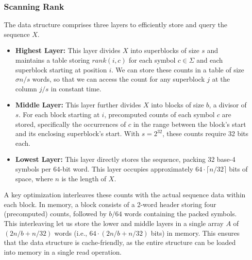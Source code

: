 
\subsubsection{Scanning Rank}

The data structure comprises three layers to efficiently store and query the sequence \(X\).


\begin{itemize}
    \item \textbf{Highest Layer:} This layer divides \(X\) into superblocks of size \(s\) and maintains a table storing $rank(i,c)$ for each symbol $c \in \Sigma$ and each superblock starting at position \(i\). We can store these counts in a table of size $\sigma n / s$ words, so that we can access the count for any superblock $j$ at the column $j/s$ in constant time.
    \item \textbf{Middle Layer:} This layer further divides \(X\) into blocks of size \(b\), a divisor of \(s\). For each block starting at \(i\), precomputed counts of each symbol \(c\) are stored, specifically the occurrences of \(c\) in the range between the block's start and its enclosing superblock's start. With \(s=2^{32}\), these counts require 32 bits each.
    \item \textbf{Lowest Layer:} This layer directly stores the sequence, packing 32 base-4 symbols per 64-bit word. This layer occupies approximately $64 \cdot \lceil n/32 \rceil$ bits of space, where \(n\) is the length of \(X\).
\end{itemize}

\noindent A key optimization interleaves these counts with the actual sequence data within each block. In memory, a block consists of a 2-word header storing four (precomputed) counts, followed by \(b/64\) words containing the packed symbols. This interleaving let us store the lower and middle layers in a single array $A$ of $(2n/b + n/32)$ words (i.e., $64 \cdot (2n/b + n/32)$ bits) in memory. This ensures that the data structure is cache-friendly, as the entire structure can be loaded into memory in a single read operation.

